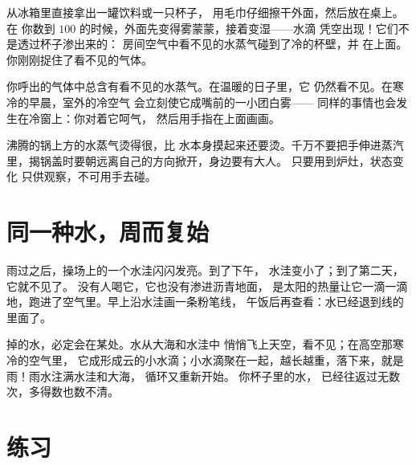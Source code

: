 \begin{example}\label{ex:g2:ice-water-steam:catch}
从冰箱里直接拿出一罐饮料或一只杯子，
用毛巾仔细擦干外面，然后放在桌上。在
你数到 $100$ 的时候，外面先变得雾蒙蒙，接着变湿——水滴
凭空出现！它们不是透过杯子渗出来的：
房间空气中看不见的水蒸气碰到了冷的杯壁，并
在上面。你刚刚捉住了看不见的气体。
\end{example}

\begin{example}[呼气成雾]\label{ex:g2:ice-water-steam:breath}
你呼出的气体中总含有看不见的水蒸气。在温暖的日子里，它
仍然看不见。在寒冷的早晨，室外的冷空气
会立刻使它成嘴前的一小团白雾——
同样的事情也会发生在冷窗上：你对着它呵气，
然后用手指在上面画画。
\end{example}

\begin{remark}\label{rem:g2:ice-water-steam:safety}
沸腾的锅上方的水蒸气烫得很，比
水本身摸起来还要烫。千万不要把手伸进蒸汽里，揭锅盖时要朝远离自己的方向掀开，身边要有大人。
只要用到炉灶，状态变化
只供观察，不可用手去碰。
\end{remark}

\section{同一种水，周而复始}

\begin{example}[水洼变小了]\label{ex:g2:ice-water-steam:puddle}
雨过之后，操场上的一个水洼闪闪发亮。到了下午，
水洼变小了；到了第二天，它就不见了。
没有人喝它，它也没有渗进沥青地面，
是太阳的热量让它一滴一滴地，跑进了空气里。早上沿水洼画一条粉笔线，
午饭后再查看：水已经退到线的里面了。
\end{example}

\begin{example}[从海洋到雨水]\label{ex:g2:ice-water-steam:cycle}
掉的水，必定会在某处。水从大海和水洼中
悄悄飞上天空，看不见；在高空那寒冷的空气里，
它成形成云的小水滴；小水滴聚在一起，越长越重，落下来，就是雨！雨水注满水洼和大海，
循环又重新开始。
你杯子里的水，
已经往返过无数次，多得数也数不清。
\end{example}

\section{练习}

